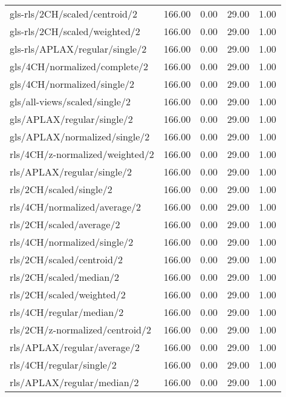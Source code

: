 \begin{longtable}{lrrrr}
    gls-rls/2CH/scaled/centroid/2             & 166.00 &  0.00 & 29.00 &  1.00 \\
    gls-rls/2CH/scaled/weighted/2             & 166.00 &  0.00 & 29.00 &  1.00 \\
    gls-rls/APLAX/regular/single/2            & 166.00 &  0.00 & 29.00 &  1.00 \\
    gls/4CH/normalized/complete/2             & 166.00 &  0.00 & 29.00 &  1.00 \\
    gls/4CH/normalized/single/2               & 166.00 &  0.00 & 29.00 &  1.00 \\
    gls/all-views/scaled/single/2             & 166.00 &  0.00 & 29.00 &  1.00 \\
    gls/APLAX/regular/single/2                & 166.00 &  0.00 & 29.00 &  1.00 \\
    gls/APLAX/normalized/single/2             & 166.00 &  0.00 & 29.00 &  1.00 \\
    rls/4CH/z-normalized/weighted/2           & 166.00 &  0.00 & 29.00 &  1.00 \\
    rls/APLAX/regular/single/2                & 166.00 &  0.00 & 29.00 &  1.00 \\
    rls/2CH/scaled/single/2                   & 166.00 &  0.00 & 29.00 &  1.00 \\
    rls/4CH/normalized/average/2              & 166.00 &  0.00 & 29.00 &  1.00 \\
    rls/2CH/scaled/average/2                  & 166.00 &  0.00 & 29.00 &  1.00 \\
    rls/4CH/normalized/single/2               & 166.00 &  0.00 & 29.00 &  1.00 \\
    rls/2CH/scaled/centroid/2                 & 166.00 &  0.00 & 29.00 &  1.00 \\
    rls/2CH/scaled/median/2                   & 166.00 &  0.00 & 29.00 &  1.00 \\
    rls/2CH/scaled/weighted/2                 & 166.00 &  0.00 & 29.00 &  1.00 \\
    rls/4CH/regular/median/2                  & 166.00 &  0.00 & 29.00 &  1.00 \\
    rls/2CH/z-normalized/centroid/2           & 166.00 &  0.00 & 29.00 &  1.00 \\
    rls/APLAX/regular/average/2               & 166.00 &  0.00 & 29.00 &  1.00 \\
    rls/4CH/regular/single/2                  & 166.00 &  0.00 & 29.00 &  1.00 \\
    rls/APLAX/regular/median/2                & 166.00 &  0.00 & 29.00 &  1.00 \\

\end{longtable}
